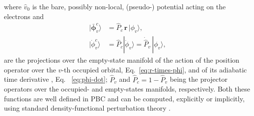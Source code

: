 where  $\hat v_0$ is the bare, possibly non-local, (pseudo-) potential acting on the electrons and
\begin{align}
  |\bm{\bar \phi}_v^c\rangle &= \hat P_c \,\mathbf{r}  \,|\phi_v \rangle, \label{eq:r-times-phi} \\
  |\dot \phi_v^c\rangle &= \hat P_c |\dot\phi_v\rangle = \dot{\hat P}_v \,|\phi_v\rangle, \label{eq:phi-dot}
\end{align}
are the projections over the empty-state manifold of the action of the position operator over the $v$-th occupied orbital, Eq.~\eqref{eq:r-times-phi}, and of its adiabatic time derivative \cite{Giannozzi2017}, Eq.~ \eqref{eq:phi-dot}; $\hat P_v$ and $\hat P_c = 1 - \hat P_v$ being the projector operators over the occupied- and empty-states manifolds, respectively. Both these functions are well defined in PBC and can be computed, explicitly or implicitly, using standard density-functional perturbation theory \cite{Baroni2001}.


